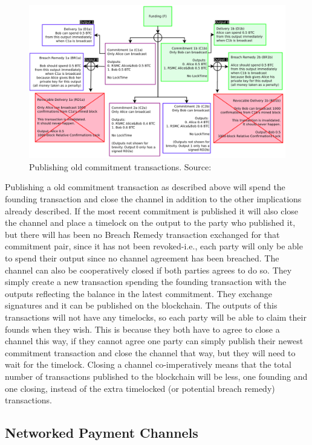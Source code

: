 \begin{figure}[ht]
    \centering
    \includegraphics[width=14cm]{figures/ln_breach.png}
    \caption{Publishing old commitment transactions. Source: \cite{poon2015bitcoin}}
    \label{fig:ln_breach}
\end{figure}

Publishing a old commitment transaction as described above will spend the founding transaction and close the channel in addition to the other implications already described. If the most recent commitment is published it will also close the channel and place a timelock on the output to the party who published it, but there will has been no Breach Remedy transaction exchanged for that commitment pair, since it has not been revoked-i.e., each party will only be able to spend their output since no channel agreement has been breached.
The channel can also be cooperatively closed if both parties agrees to do so. They simply create a new transaction spending the founding transaction with the outputs reflecting the balance in the latest commitment. They exchange signatures and it can be published on the blockchain. The outputs of this transactions will not have any timelocks, so each party will be able to claim their founds when they wish.
This is because they both have to agree to close a channel this way, if they cannot agree one party can simply publish their newest commitment transaction and close the channel that way, but they will need to wait for the timelock.
Closing a channel co-imperatively means that the total number of transactions published to the blockchain will be less, one founding and one closing, instead of the extra timelocked (or potential breach remedy) transactions.

\subsection{Networked Payment Channels}
\label{subsec:networkpcln}

